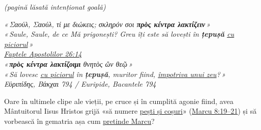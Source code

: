 \documentclass[12pt,a4paper,twoside,openany]{book}
\begin{document}
\thispagestyle{empty}
\vspace*{\fill}
\begin{center}
{\small\color{gray}\textit{(pagină lăsată intenționat goală)}}
\end{center}
\vspace*{\fill}
\newpage

\thispagestyle{empty}
\vspace*{\fill}

\begin{center}
\begin{minipage}{10cm}
\raggedleft\itshape\small\color{bodytext}
«\,Σαούλ, Σαούλ, τί με διώκεις; σκληρόν σοι \textbf{πρὸς κέντρα λακτίζειν}\,»\\[2pt]
«\,Saule, Saule, de ce Mă prigonești? Greu îți este să lovești în \textbf{țepușă} \underline{cu piciorul}\,»\\[1pt]
\upshape\footnotesize\color{gray}
\href{https://bibliaortodoxa.ro/carte.php?id=26\&cap=26\#14}{\textit{Faptele Apostolilor} 26:14}\\[6pt]
\itshape\small\color{bodytext}
«\,\textbf{πρὸς κέντρα λακτίζοιμι} θνητὸς ὢν θεῷ\,»\\[2pt]
«\,Să lovesc \underline{cu piciorul} în \textbf{țepușă}, muritor fiind, \underline{împotriva unui zeu}?\,»\\[1pt]
\upshape\footnotesize\color{gray}
Εὐριπίδης, \textit{Βάκχαι} 794 / Euripide, \textit{Bacantele} 794
\end{minipage}
\end{center}

\vspace{0.6em}

\begin{center}
\begin{minipage}{10cm}
\raggedleft\small\color{bodytext}
Oare în ultimele clipe ale vieții, pe cruce și în cumplită agonie fiind, avea Mântuitorul Iisus Hristos grijă «să numere \hyperlink{pesti-cosuri}{pești și coșuri}» (\href{https://bibliaortodoxa.ro/carte.php?id=53\&cap=8\#19}{Marcu 8:19--21}) și să vorbească în gematria așa cum \hyperref[strigat]{pretinde Marcu}?
\end{minipage}
\end{center}

\vspace{0.8em}
\end{document}
